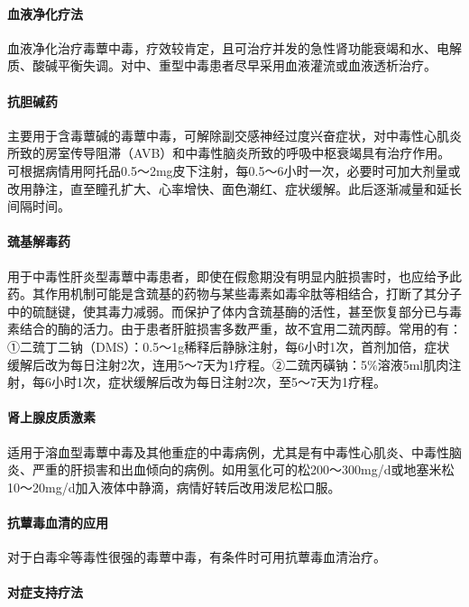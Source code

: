 \paragraph{血液净化疗法}

血液净化治疗毒蕈中毒，疗效较肯定，且可治疗并发的急性肾功能衰竭和水、电解质、酸碱平衡失调。对中、重型中毒患者尽早采用血液灌流或血液透析治疗。

\paragraph{抗胆碱药}

主要用于含毒蕈碱的毒蕈中毒，可解除副交感神经过度兴奋症状，对中毒性心肌炎所致的房室传导阻滞（AVB）和中毒性脑炎所致的呼吸中枢衰竭具有治疗作用。可根据病情用阿托品0.5～2mg皮下注射，每0.5～6小时一次，必要时可加大剂量或改用静注，直至瞳孔扩大、心率增快、面色潮红、症状缓解。此后逐渐减量和延长间隔时间。

\paragraph{巯基解毒药}

用于中毒性肝炎型毒蕈中毒患者，即使在假愈期没有明显内脏损害时，也应给予此药。其作用机制可能是含巯基的药物与某些毒素如毒伞肽等相结合，打断了其分子中的硫醚键，使其毒力减弱。而保护了体内含巯基酶的活性，甚至恢复部分已与毒素结合的酶的活力。由于患者肝脏损害多数严重，故不宜用二巯丙醇。常用的有：①二巯丁二钠（DMS）：0.5～1g稀释后静脉注射，每6小时1次，首剂加倍，症状缓解后改为每日注射2次，连用5～7天为1疗程。②二巯丙磺钠：5\%溶液5ml肌肉注射，每6小时1次，症状缓解后改为每日注射2次，至5～7天为1疗程。

\paragraph{肾上腺皮质激素}

适用于溶血型毒蕈中毒及其他重症的中毒病例，尤其是有中毒性心肌炎、中毒性脑炎、严重的肝损害和出血倾向的病例。如用氢化可的松200～300mg/d或地塞米松10～20mg/d加入液体中静滴，病情好转后改用泼尼松口服。

\paragraph{抗蕈毒血清的应用}

对于白毒伞等毒性很强的毒蕈中毒，有条件时可用抗蕈毒血清治疗。

\paragraph{对症支持疗法}

